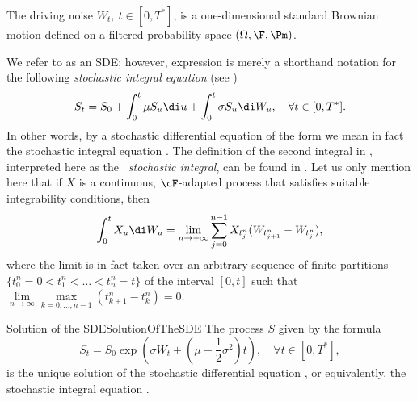 The driving noise $W_t, \ t \in [0, T^*]$, is a one-dimensional standard Brownian motion defined on a filtered probability space $(\Omega, \F, \Pm)$.

We refer to  as an SDE; however, expression  is merely a shorthand notation for the following \emph{stochastic integral equation} (see )
\begin{equation} \label{eq:StochasticIntegralEquation}
	S_t = S_0 + \int_0^t \mu S_u \di u + \int_0^t \sigma S_u \di W_u, \quad \forall t \in [0, T^*].
\end{equation}
In other words, by a stochastic differential equation of the form  we mean in fact the stochastic integral equation . The definition of the second integral in , interpreted here as the \emph{\Ito\ stochastic integral}, can be found in . Let us only mention here that if $X$ is a continuous, $\cF$-adapted process that satisfies suitable integrability conditions, then
\begin{equation} \label{eq:ItoIntegralDefinition}
	\int_0^t X_u \di W_u = \lim_{n \to +\infty} \sum_{j=0}^{n-1} X_{t_j^n} (W_{t_{j+1}^n} - W_{t_j^n}),
\end{equation}
where the limit is in fact taken over an arbitrary sequence of finite partitions $\{t_0^n = 0 < t_1^n < \dots < t_n^n = t\}$ of the interval $[0, t]$ such that $\lim\limits_{n \to \infty} \max\limits_{k=0, \dots, n-1} (t_{k+1}^n - t_k^n) = 0$.

\begin{prop}{Solution of the SDE}{SolutionOfTheSDE}
	The process $S$ given by the formula
	\begin{equation} \label{eq:GeometricBrownianMotionExplicit}
		S_t = S_0 \exp \left(\sigma W_t + \left(\mu - \frac{1}{2}\sigma^2\right)t\right), \quad \forall t \in [0, T^*],
	\end{equation}
	is the unique solution of the stochastic differential equation , or equivalently, the stochastic integral equation .
\end{prop}

